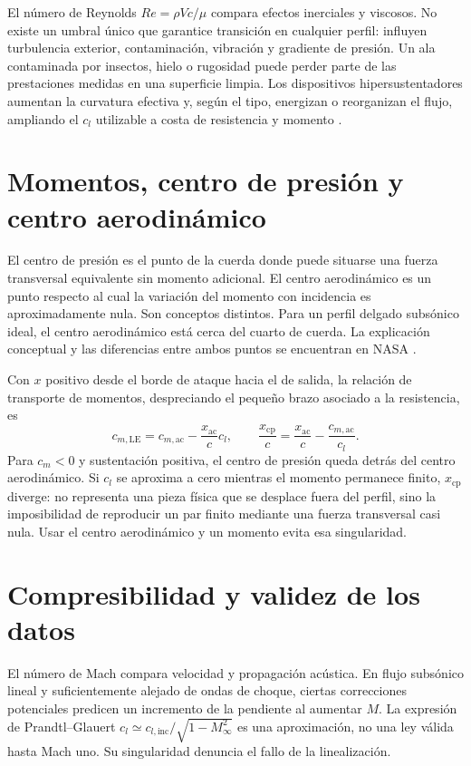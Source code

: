 El número de Reynolds $Re=\rho Vc/\mu$ compara efectos inerciales y viscosos. No existe un umbral único que garantice transición en cualquier perfil: influyen turbulencia exterior, contaminación, vibración y gradiente de presión. Un ala contaminada por insectos, hielo o rugosidad puede perder parte de las prestaciones medidas en una superficie limpia. Los dispositivos hipersustentadores aumentan la curvatura efectiva y, según el tipo, energizan o reorganizan el flujo, ampliando el $c_l$ utilizable a costa de resistencia y momento \cite{PHAK}.

\section{Momentos, centro de presión y centro aerodinámico}
El centro de presión es el punto de la cuerda donde puede situarse una fuerza transversal equivalente sin momento adicional. El centro aerodinámico es un punto respecto al cual la variación del momento con incidencia es aproximadamente nula. Son conceptos distintos. Para un perfil delgado subsónico ideal, el centro aerodinámico está cerca del cuarto de cuerda. La explicación conceptual y las diferencias entre ambos puntos se encuentran en NASA \cite{NASA-BGA}.

Con $x$ positivo desde el borde de ataque hacia el de salida, la relación de transporte de momentos, despreciando el pequeño brazo asociado a la resistencia, es
\begin{equation}
c_{m,\mathrm{LE}}=c_{m,\mathrm{ac}}-\frac{x_{\mathrm{ac}}}{c}c_l,
\qquad
\frac{x_{\mathrm{cp}}}{c}=\frac{x_{\mathrm{ac}}}{c}-\frac{c_{m,\mathrm{ac}}}{c_l}.
\end{equation}
Para $c_m<0$ y sustentación positiva, el centro de presión queda detrás del centro aerodinámico. Si $c_l$ se aproxima a cero mientras el momento permanece finito, $x_{\mathrm{cp}}$ diverge: no representa una pieza física que se desplace fuera del perfil, sino la imposibilidad de reproducir un par finito mediante una fuerza transversal casi nula. Usar el centro aerodinámico y un momento evita esa singularidad.

\section{Compresibilidad y validez de los datos}
El número de Mach compara velocidad y propagación acústica. En flujo subsónico lineal y suficientemente alejado de ondas de choque, ciertas correcciones potenciales predicen un incremento de la pendiente al aumentar $M$. La expresión de Prandtl--Glauert $c_l\simeq c_{l,\mathrm{inc}}/\sqrt{1-M_\infty^2}$ es una aproximación, no una ley válida hasta Mach uno. Su singularidad denuncia el fallo de la linealización.

